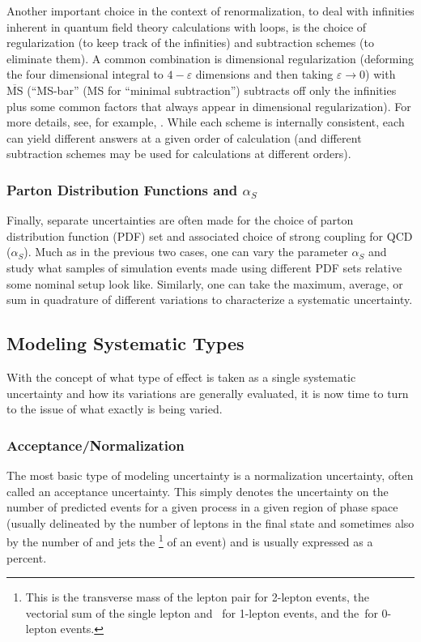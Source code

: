 Another important choice in the context of renormalization, to deal with infinities inherent in quantum field theory calculations with loops, is the choice of regularization (to keep track of the infinities) and subtraction schemes (to eliminate them).  A common combination is dimensional regularization (deforming the four dimensional integral to $4-\varepsilon$ dimensions and then taking $\varepsilon\to0$) with $\overline{\text{MS}}$ (``MS-bar'' (MS for ``minimal subtraction'') subtracts off only the infinities plus some common factors that always appear in dimensional regularization).  For more details, see, for example, \cite{schwartz}.  While each scheme is internally consistent, each can yield different answers at a given order of calculation (and different subtraction schemes may be used for calculations at different orders).

\subsubsection{Parton Distribution Functions and $\alpha_S$}
\label{sec:pdfas}
Finally, separate uncertainties are often made for the choice of parton distribution function (PDF) set and associated choice of strong coupling for QCD ($\alpha_S$).  Much as in the previous two cases, one can vary the parameter $\alpha_S$ and study what samples of simulation events made using different PDF sets relative some nominal setup look like.  Similarly, one can take the maximum, average, or sum in quadrature of different variations to characterize a systematic uncertainty.

\subsection{Modeling Systematic Types}
With the concept of what type of effect is taken as a single systematic uncertainty and how its variations are generally evaluated, it is now time to turn to the issue of what exactly is being varied.
\subsubsection{Acceptance/Normalization}
The most basic type of modeling uncertainty is a normalization uncertainty, often called an acceptance uncertainty.  This simply denotes the uncertainty on the number of predicted events for a given process in a given region of phase space (usually delineated by the number of leptons in the final state and sometimes also by the number of and jets the \ptv\footnote{This is the transverse mass of the lepton pair for 2-lepton events, the vectorial sum of the single lepton and \met\, for 1-lepton events, and the \met\,for 0-lepton events.} of an event) and is usually expressed as a percent.  

